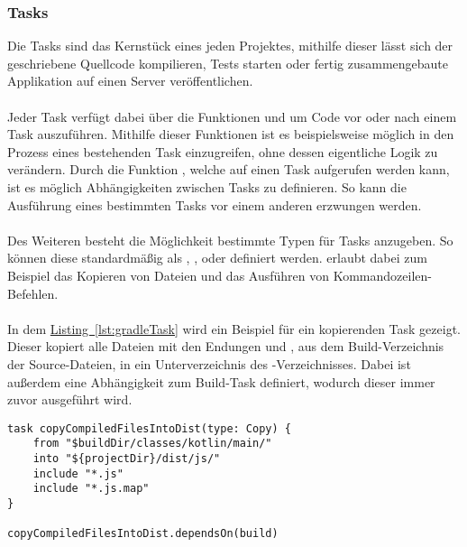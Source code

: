 \subsubsection{Tasks}
Die Tasks sind das Kernstück eines jeden Projektes, mithilfe dieser lässt sich der geschriebene Quellcode kompilieren, Tests starten oder fertig zusammengebaute Applikation auf einen Server veröffentlichen.\\
\\
Jeder Task verfügt dabei über die Funktionen  und  um Code vor oder nach einem Task auszuführen. Mithilfe dieser Funktionen ist es beispielsweise möglich in den Prozess eines bestehenden Task einzugreifen, ohne dessen eigentliche Logik zu verändern. Durch die Funktion , welche auf einen Task aufgerufen werden kann, ist es möglich Abhängigkeiten zwischen Tasks zu definieren. So kann die Ausführung eines bestimmten Tasks vor einem anderen erzwungen werden.\\
\\
Des Weiteren besteht die Möglichkeit bestimmte Typen für Tasks anzugeben. So können diese standardmäßig als , ,  oder  definiert werden.  erlaubt dabei zum Beispiel das Kopieren von Dateien und  das Ausführen von Kommandozeilen-Befehlen.\\
\\
In dem \hyperref[lst:gradleTask]{Listing~\ref{lst:gradleTask}} wird ein Beispiel für ein kopierenden Task gezeigt. Dieser kopiert alle Dateien mit den Endungen  und , aus dem Build-Verzeichnis der Source-Dateien, in ein Unterverzeichnis  des -Verzeichnisses. Dabei ist außerdem eine Abhängigkeit zum Build-Task definiert, wodurch dieser immer zuvor ausgeführt wird.
\begin{lstlisting}[style=lstStyleFramed, language=Gradle, caption={Beispiel: Gradle-Task}, label=lst:gradleTask, float]
task copyCompiledFilesIntoDist(type: Copy) {
	from "$buildDir/classes/kotlin/main/"
	into "${projectDir}/dist/js/"
	include "*.js"
	include "*.js.map"
}

copyCompiledFilesIntoDist.dependsOn(build)
\end{lstlisting}

